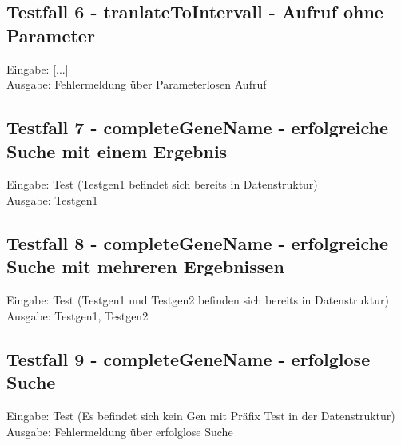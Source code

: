 \documentclass[]{article}
\begin{document}
\subsection{Testfall 6 - tranlateToIntervall - Aufruf ohne Parameter}
Eingabe: [...]\\
Ausgabe: Fehlermeldung über Parameterlosen Aufruf

\subsection{Testfall 7 - completeGeneName - erfolgreiche Suche mit einem Ergebnis}
Eingabe: Test (Testgen1 befindet sich bereits in Datenstruktur)\\
Ausgabe: Testgen1

\subsection{Testfall 8 - completeGeneName - erfolgreiche Suche mit mehreren Ergebnissen}
Eingabe: Test (Testgen1 und Testgen2 befinden sich bereits in Datenstruktur)\\
Ausgabe: Testgen1, Testgen2

\subsection{Testfall 9 - completeGeneName - erfolglose Suche}
Eingabe: Test (Es befindet sich kein Gen mit Präfix Test in der Datenstruktur)\\
Ausgabe: Fehlermeldung über erfolglose Suche
\end{document}
